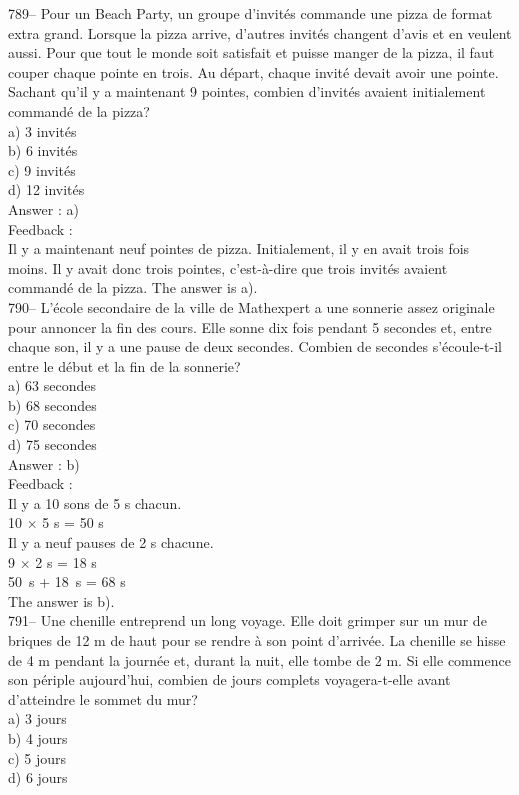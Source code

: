 ﻿\documentclass[letterpaper, 12pt]{article}
\begin{document}
789-- Pour un \og Beach Party\fg , un groupe d'invit\'es commande
une pizza de format extra grand.  Lorsque la pizza arrive, d'autres
invit\'es changent d'avis et en veulent aussi.  Pour que tout le
monde soit satisfait et puisse manger de la pizza, il faut couper
chaque pointe en trois.  Au d\'epart, chaque invit\'e devait avoir
une pointe.  Sachant qu'il y a maintenant 9
pointes, combien d'invit\'es avaient initialement command\'e de la pizza?\\
a) 3 invit\'es\\
b) 6 invit\'es\\
c) 9 invit\'es\\
d) 12 invit\'es\\

Answer : a)\\

Feedback : \\
Il y a maintenant neuf pointes de pizza.  Initialement, il y en avait trois
fois moins.  Il y avait donc trois pointes, c'est-\`a-dire que trois
invit\'es avaient command\'e de la pizza.  The answer is a).\\

790-- L'\'ecole secondaire de la ville de Mathexpert a une sonnerie assez
originale pour annoncer la fin des cours.  Elle sonne dix fois pendant 5
secondes et, entre chaque son, il y a une pause de deux secondes.  Combien
de secondes s'\'ecoule-t-il entre le d\'ebut et la fin de la sonnerie?\\
a) 63 secondes\\
b) 68 secondes\\
c) 70 secondes\\
d) 75 secondes\\

Answer : b)\\

Feedback : \\
Il y a 10 sons de 5 s chacun.\\
10 $\times$ 5 s  = 50 s \\
Il y a neuf pauses de 2 s chacune.\\
9 $\times$ 2 s = 18 s \\
50~s + 18~s = 68 s\\
The answer is b).\\

791-- Une chenille entreprend un long voyage.  Elle doit grimper sur un mur
de briques de 12 m de haut pour se rendre \`a son point d'arriv\'ee.  La
chenille se hisse de 4 m pendant la journ\'ee et, durant la nuit, elle tombe
de 2 m.  Si elle commence son p\'eriple aujourd'hui, combien de jours
complets voyagera-t-elle avant d'atteindre le sommet du mur?\\
a) 3 jours\\
b) 4 jours\\
c) 5 jours\\
d) 6 jours\\
\end{document}

